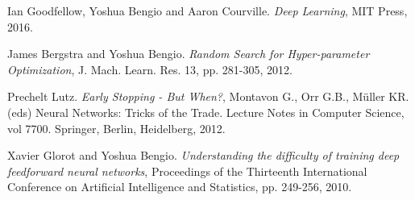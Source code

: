 \documentclass[11pt,twoside]{article}
\begin{document}
\begin{thebibliography}{99} %
    Ian Goodfellow, Yoshua Bengio and Aaron Courville.
    \textit{Deep Learning}, MIT Press, 2016.

    James Bergstra and Yoshua Bengio.
    \textit{Random Search for Hyper-parameter Optimization}, J. Mach. Learn. Res. 13, pp. 281-305, 2012.

    Prechelt Lutz.
    \textit{Early Stopping - But When?}, Montavon G., Orr G.B., Müller KR. (eds) Neural Networks: Tricks of the
    Trade. Lecture Notes in Computer Science, vol 7700. Springer, Berlin, Heidelberg, 2012.

    Xavier Glorot and Yoshua Bengio.
    \textit{Understanding the difficulty of training deep feedforward neural networks},
    Proceedings of the Thirteenth International Conference on Artificial Intelligence and Statistics, pp.
    249-256, 2010.
\end{thebibliography}

\newpage


\end{document}
